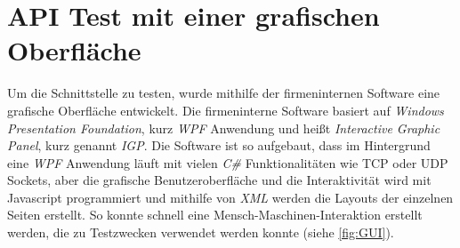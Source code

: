 \section{API Test mit einer grafischen Oberfläche}
Um die Schnittstelle zu testen, wurde mithilfe der firmeninternen Software eine grafische Oberfläche entwickelt. Die firmeninterne Software basiert auf \textit{Windows Presentation Foundation}, kurz \textit{WPF} Anwendung und heißt \textit{Interactive Graphic Panel}, kurz genannt \textit{IGP}. Die Software ist so aufgebaut, dass im Hintergrund eine \textit{WPF} Anwendung läuft mit vielen \textit{C\#} Funktionalitäten wie TCP oder UDP Sockets, aber die grafische Benutzeroberfläche und die Interaktivität wird mit Javascript programmiert und mithilfe von \textit{XML} werden die Layouts der einzelnen Seiten erstellt. So konnte schnell eine Mensch-Maschinen-Interaktion erstellt werden, die zu Testzwecken verwendet werden konnte (siehe \autoref{fig:GUI}). \\ 

\begin{figure}[H]
\captionsetup[subfloat]{labelformat=empty}
  \centering
  \qquad
  \qquad
  \label{fig:GUI1}
\end{figure}

